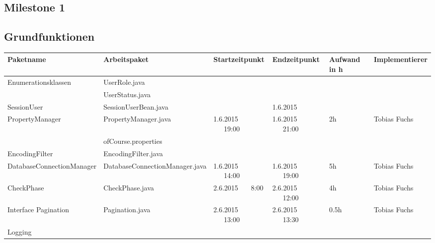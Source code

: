 \begin{landscape}
\section{Milestone 1}

\subsection{Grundfunktionen}
\begin{tabular}{|p{6cm} |p{6cm}|p{3cm}|p{3cm}|p{2cm}|p{3.5cm}|}
	\hline \textbf{Paketname} & \textbf{Arbeitspaket} & \textbf{Startzeitpunkt} & \textbf{Endzeitpunkt} & \textbf{Aufwand in h} & \textbf{Implementierer} \\ 
	\hline  Enumerationsklassen  & UserRole.java                            &                             &                             &                     &\\ 
	& UserStatus.java                          &                            &                             &                     &\\ 
	\hline  SessionUser          & SessionUserBean.java                     &                             & 1.6.2015                    &                     &\\ 
	\hline  PropertyManager      & PropertyManager.java                     & 1.6.2015 \ \ \ 19:00        & 1.6.2015 \ \ \ 21:00        &  2h                 & Tobias Fuchs\\ 
	& ofCourse.properties                      &                            &                              &                                                  &\\
	\hline  EncodingFilter       & EncodingFilter.java                      &                              &                             &                    &\\ 
	\hline  DatabaseConnectionManager       &  DatabaseConnectionManager.java & 1.6.2015 \ \ \ 14:00       & 1.6.2015  \ \ \  19:00      &  5h                & Tobias Fuchs\\   
	\hline  CheckPhase           & CheckPhase.java                            & 2.6.2015 \ \ \ 8:00        & 2.6.2015  \ \ \  12:00      &  4h                & Tobias Fuchs\\
	\hline  Interface Pagination & Pagination.java                            & 2.6.2015 \ \ \ 13:00       & 2.6.2015  \ \ \  13:30      &  0.5h              & Tobias Fuchs\\
	\hline  Logging              &                                            &                            &                             &                    &\\ 

\end{tabular}
\end{landscape}
